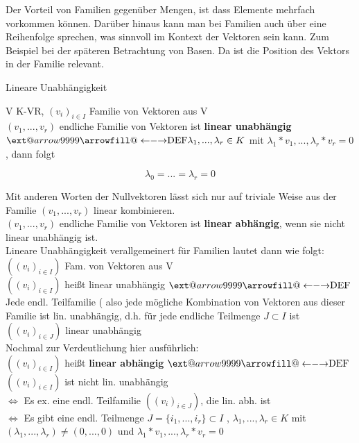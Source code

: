 \documentclass[headsepline,12pt,a4paper]{scrartcl}
\makeatletter
\newcommand\xleftrightarrow[2][]{%
  \ext@arrow 9999{\longleftrightarrowfill@}{#1}{#2}}
\newcommand\longleftrightarrowfill@{%
  \arrowfill@\leftarrow\relbar\rightarrow}
\makeatother
\begin{document}
Der Vorteil von Familien gegenüber Mengen, ist dass Elemente mehrfach vorkommen können. Darüber hinaus kann man bei Familien auch über eine Reihenfolge sprechen, was sinnvoll im Kontext der Vektoren sein kann. Zum Beispiel bei der späteren Betrachtung von Basen. Da ist die Position des Vektors in der Familie relevant. \\

\newpage

\begin{center}
\item[Lineare Unabhängigkeit]
\end{center}

V K-VR, $(v_i)_{i \in I}$ Familie von Vektoren aus V \\
$(v_1,...,v_r)$ endliche Familie von Vektoren ist \textbf{linear unabhängig} $ \xleftrightarrow{\text{DEF}} \lambda_1,..., \lambda_r \in K $ mit $ \lambda_1 * v_1 ,..., \lambda_r * v_r = 0 $, dann folgt 

$$ \lambda_0 = ... = \lambda_r = 0 $$

Mit anderen Worten der Nullvektoren lässt sich nur auf triviale Weise aus der Familie $(v_1,...,v_r)$ linear kombinieren. \\
$(v_1,...,v_r)$ endliche Familie von Vektoren ist \textbf{linear abhängig}, wenn sie nicht linear unabhängig ist. \\

Lineare Unabhängigkeit verallgemeinert für Familien lautet dann wie folgt: \\
$((v_i)_{i \in I}) $ Fam. von Vektoren aus V \\
$((v_i)_{i \in I})$ heißt linear unabhängig $ \xleftrightarrow{\text{DEF}} $ Jede endl. Teilfamilie ( also jede mögliche Kombination von Vektoren aus dieser Familie ist lin. unabhängig, d.h. für jede endliche Teilmenge $J \subset I $ ist $((v_i)_{i \in J})$ linear unabhängig \\

Nochmal zur Verdeutlichung hier ausführlich: \\
$((v_i)_{i \in I})$ heißt \textbf{linear abhängig} $ \xleftrightarrow{\text{DEF}} $ $((v_i)_{i \in I})$ ist nicht lin. unabhängig \\

$ \Leftrightarrow $ Es ex. eine endl. Teilfamilie $((v_i)_{i \in J})$, die lin. abh. ist  \\

$ \Leftrightarrow $ Es gibt eine endl. Teilmenge $J=\{i_1,...,i_r\} \subset I $ , $ \lambda_1,..., \lambda_r \in K $ mit \\
$ ( \lambda_1,..., \lambda_r ) \neq (0,...,0) $ und $ \lambda_1 * v_1 ,..., \lambda_r * v_r = 0 $ \\
\end{document}
